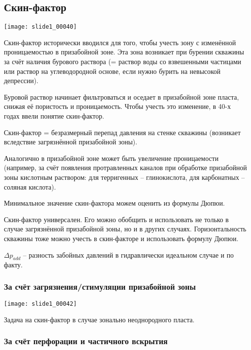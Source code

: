 \documentclass[main.tex]{subfiles}
\begin{document}
\subsection{Скин-фактор}

\texttt{[image: slide1\_00040]}

Скин-фактор исторически вводился для того, чтобы учесть зону с изменённой проницаемостью в призабойной зоне. Эта зона возникает при бурении скважины за счёт наличия бурового раствора (= раствор воды со взвешенными частицами или раствор на углеводородной основе, если нужно бурить на невысокой депрессии).

Буровой раствор начинает фильтроваться и оседает в призабойной зоне пласта, снижая её пористость и проницаемость. Чтобы учесть это изменение, в 40-х годах ввели понятие скин-фактор.

Скин-фактор = безразмерный перепад давления на стенке скважины (возникает вследствие загрязнённой призабойной зоны).

Аналогично в призабойной зоне может быть увеличение проницаемости (например, за счёт появления протравленных каналов при обработке призабойной зоны кислотным раствором: для терригенных  -- глинокислота, для карбонатных -- соляная кислота).

Минимальное значение скин-фактора можем оценить из формулы Дюпюи.


Скин-фактор универсален. Его можно обобщить и использовать не только в случае загрязнённой призабойной зоны, но и в других случаях. Горизонтальность скважины тоже можно учесть в скин-факторе и использовать формулу Дюпюи.

$\Delta p_{add}$ -- разность забойных давлений в гидравлически идеальном случае и по факту.

\subsubsection{За счёт загрязнения/стимуляции призабойной зоны}

\texttt{[image: slide1\_00042]}

Задача на скин-фактор в случае зонально неоднородного пласта.

\subsubsection{За счёт перфорации и частичного вскрытия}
\end{document}
